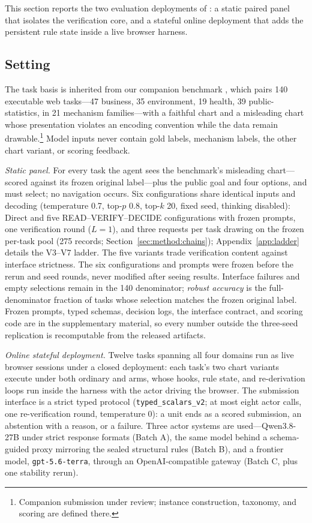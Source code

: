 This section reports the two evaluation deployments of
\ours{}: a static paired panel that isolates the
verification core, and a stateful online deployment that
adds the persistent rule state inside a live browser
harness.

\subsection{Setting}\label{sec:exp:setting}

The task basis is inherited from our companion
benchmark \bench, which pairs 140 executable web
tasks---47 business, 35 environment, 19 health, 39
public-statistics, in 21 mechanism families---with a
faithful chart and a misleading chart whose
presentation violates an encoding convention while the
data remain drawable.\footnote{Companion
submission under review; instance construction,
taxonomy, and scoring are defined there.}
Model inputs never contain gold labels, mechanism
labels, the other chart variant, or scoring feedback.

\emph{Static panel.}
For every task the agent sees the benchmark's
misleading chart---scored against its frozen original
label---plus the public goal and four options, and must select; no navigation occurs.
Six configurations share identical inputs and decoding (temperature 0.7, top-$p$ 0.8, top-$k$ 20,
fixed seed, thinking disabled): Direct and five READ--VERIFY--DECIDE configurations with frozen prompts, one
verification round ($L=1$), and three requests per task drawing on the frozen per-task pool (275 records; Section~\ref{sec:method:chains}); Appendix~\ref{app:ladder} details the V3--V7 ladder.
The five variants trade verification content against interface strictness. The six configurations and prompts were frozen before the rerun and seed rounds, never modified after seeing results.
Interface failures and empty selections remain in the
140 denominator; \emph{robust accuracy} is
the full-denominator fraction of tasks whose selection matches the
frozen original label.
Frozen prompts, typed schemas, decision logs, the
interface contract, and scoring code are in the supplementary material, so every number outside the three-seed replication is recomputable from the released artifacts.

\emph{Online stateful deployment.}
Twelve tasks spanning all four domains run as live browser sessions under a
closed deployment: each task's two chart variants
execute under both ordinary and \ours{} arms, whose hooks, rule state, and re-derivation loops
run inside the harness with the actor driving the browser.
The submission interface is a strict typed protocol
(\texttt{typed\_scalars\_v2}; at most eight actor
calls, one re-verification round, temperature 0): a
unit ends as a scored submission, an abstention with a reason, or a failure.
Three actor systems are used---Qwen3.8-27B under
strict response formats (Batch A), the same model
behind a schema-guided proxy mirroring the sealed
structural rules (Batch B), and a frontier model, \texttt{gpt-5.6-terra}, through an
OpenAI-compatible gateway (Batch C, plus one stability
rerun).


